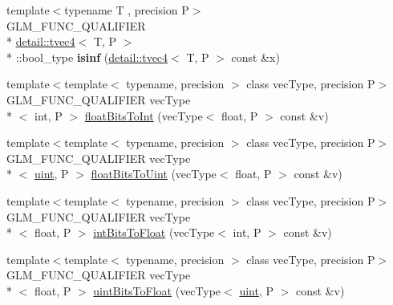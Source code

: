 \begin{DoxyCompactItemize}
\item 
\hypertarget{namespaceglm_a6f75f001a105575c80f78d83e038b2d1}{{\footnotesize template$<$typename T , precision P$>$ }\\G\-L\-M\-\_\-\-F\-U\-N\-C\-\_\-\-Q\-U\-A\-L\-I\-F\-I\-E\-R \\*
\hyperlink{structglm_1_1detail_1_1tvec4}{detail\-::tvec4}$<$ T, P $>$\\*
\-::bool\-\_\-type {\bfseries isinf} (\hyperlink{structglm_1_1detail_1_1tvec4}{detail\-::tvec4}$<$ T, P $>$ const \&x)}\label{namespaceglm_a6f75f001a105575c80f78d83e038b2d1}

\item 
{\footnotesize template$<$template$<$ typename, precision $>$ class vec\-Type, precision P$>$ }\\G\-L\-M\-\_\-\-F\-U\-N\-C\-\_\-\-Q\-U\-A\-L\-I\-F\-I\-E\-R vec\-Type\\*
$<$ int, P $>$ \hyperlink{group__core__func__common_gac4a0710238ae54c67931dd29a0b0f873}{float\-Bits\-To\-Int} (vec\-Type$<$ float, P $>$ const \&v)
\item 
{\footnotesize template$<$template$<$ typename, precision $>$ class vec\-Type, precision P$>$ }\\G\-L\-M\-\_\-\-F\-U\-N\-C\-\_\-\-Q\-U\-A\-L\-I\-F\-I\-E\-R vec\-Type\\*
$<$ \hyperlink{group__core__precision_ga4fd29415871152bfb5abd588334147c8}{uint}, P $>$ \hyperlink{group__core__func__common_ga1804d4c443605d8a27be644aa461afe4}{float\-Bits\-To\-Uint} (vec\-Type$<$ float, P $>$ const \&v)
\item 
{\footnotesize template$<$template$<$ typename, precision $>$ class vec\-Type, precision P$>$ }\\G\-L\-M\-\_\-\-F\-U\-N\-C\-\_\-\-Q\-U\-A\-L\-I\-F\-I\-E\-R vec\-Type\\*
$<$ float, P $>$ \hyperlink{group__core__func__common_gad21ab176dd0e6b59d923db5efca87f4e}{int\-Bits\-To\-Float} (vec\-Type$<$ int, P $>$ const \&v)
\item 
{\footnotesize template$<$template$<$ typename, precision $>$ class vec\-Type, precision P$>$ }\\G\-L\-M\-\_\-\-F\-U\-N\-C\-\_\-\-Q\-U\-A\-L\-I\-F\-I\-E\-R vec\-Type\\*
$<$ float, P $>$ \hyperlink{group__core__func__common_ga3acab37650ecd792dc84548094b58684}{uint\-Bits\-To\-Float} (vec\-Type$<$ \hyperlink{group__core__precision_ga4fd29415871152bfb5abd588334147c8}{uint}, P $>$ const \&v)
\item 

\end{DoxyCompactItemize}
